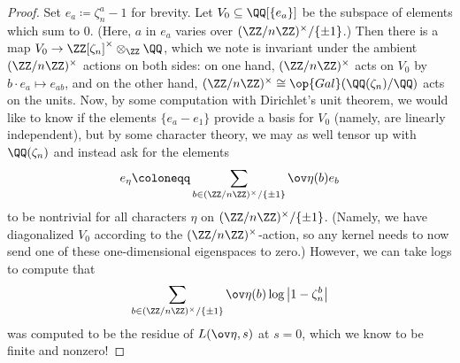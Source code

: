 \documentclass{article}
\begin{document}
\begin{proof}
	Set $e_a\coloneqq\zeta_n^a-1$ for brevity. Let $V_0\subseteq\QQ[\{e_a\}]$ be the subspace of elements which sum to $0$. (Here, $a$ in $e_a$ varies over $(\ZZ/n\ZZ)^\times/\{\pm1\}$.) Then there is a map $V_0\to\ZZ[\zeta_n]^\times\otimes_\ZZ\QQ$, which we note is invariant under the ambient $(\ZZ/n\ZZ)^\times$ actions on both sides: on one hand, $(\ZZ/n\ZZ)^\times$ acts on $V_0$ by $b\cdot e_a\mapsto e_{ab}$, and on the other hand, $(\ZZ/n\ZZ)^\times\cong\op{Gal}(\QQ(\zeta_n)/\QQ)$ acts on the units. Now, by some computation with Dirichlet's unit theorem, we would like to know if the elements $\{e_a-e_1\}$ provide a basis for $V_0$ (namely, are linearly independent), but by some character theory, we may as well tensor up with $\QQ(\zeta_n)$ and instead ask for the elements
	\[e_\eta\coloneqq\sum_{b\in(\ZZ/n\ZZ)^\times/\{\pm1\}}\ov\eta(b)e_b\]
	to be nontrivial for all characters $\eta$ on $(\ZZ/n\ZZ)^\times/\{\pm1\}$. (Namely, we have diagonalized $V_0$ according to the $(\ZZ/n\ZZ)^\times$-action, so any kernel needs to now send one of these one-dimensional eigenspaces to zero.) However, we can take logs to compute that
	\[\sum_{b\in(\ZZ/n\ZZ)^\times/\{\pm1\}}\ov\eta(b)\log\left|1-\zeta_n^b\right|\]
	was computed to be the residue of $L(\ov\eta,s)$ at $s=0$, which we know to be finite and nonzero!
\end{proof}
\end{document}
